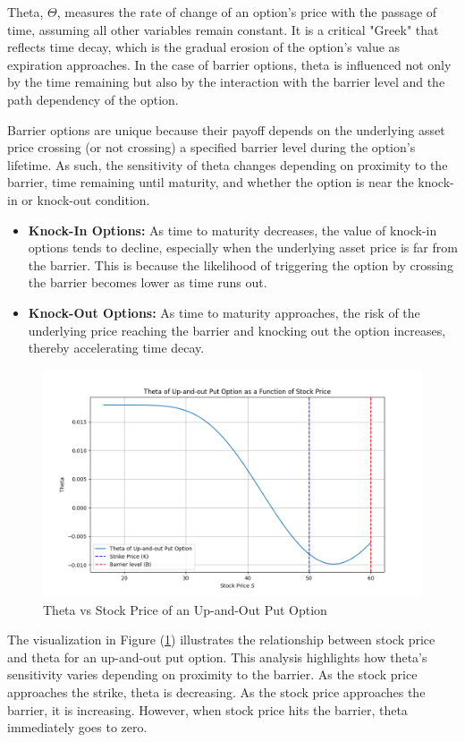 Theta, $\Theta$, measures the rate of change of an option's price with the passage of time, assuming all other variables remain constant. It is a critical "Greek" that reflects time decay, which is the gradual erosion of the option's value as expiration approaches. In the case of barrier options, theta is influenced not only by the time remaining but also by the interaction with the barrier level and the path dependency of the option.

Barrier options are unique because their payoff depends on the underlying asset price crossing (or not crossing) a specified barrier level during the option's lifetime. As such, the sensitivity of theta changes depending on proximity to the barrier, time remaining until maturity, and whether the option is near the knock-in or knock-out condition.

\begin{itemize}
    \item \textbf{Knock-In Options:} As time to maturity decreases, the value of knock-in options tends to decline, especially when the underlying asset price is far from the barrier. This is because the likelihood of triggering the option by crossing the barrier becomes lower as time runs out.
    
    \item \textbf{Knock-Out Options:} As time to maturity approaches, the risk of the underlying price reaching the barrier and knocking out the option increases, thereby accelerating time decay.
\end{itemize}


\begin{figure}[H]
    \centering
    \includegraphics[width=.65\linewidth]{content/images/theta.png}
    \caption{Theta vs Stock Price of an Up-and-Out Put Option}
    \label{fig:theta_behavior}
\end{figure}


The visualization in Figure (\ref{fig:theta_behavior}) illustrates the relationship between stock price and theta for an up-and-out put option. This analysis highlights how theta's sensitivity varies depending on proximity to the barrier. As the stock price approaches the strike, theta is decreasing. As the stock price approaches the barrier, it is increasing. However, when stock price hits the barrier, theta immediately goes to zero.



